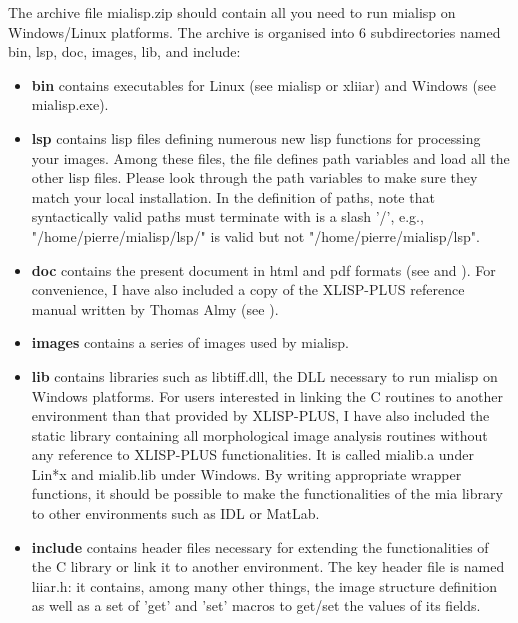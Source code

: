 \documentclass{book}
\begin{document}
The archive file mialisp.zip should contain all you need to run mialisp on Windows/Linux platforms.  The archive is organised into 6 subdirectories named bin, lsp, doc, images, lib, and include:
\begin{itemize}
\item {\bf bin} contains executables for Linux (see mialisp or xliiar) and Windows (see mialisp.exe).
\item {\bf lsp} contains lisp files defining numerous new lisp functions for processing your images.  Among these files, the file  defines path variables and load all the other lisp files.  Please look through the path variables to make sure they match your local installation.  In the definition of paths, note that syntactically valid paths must terminate with is a slash '/', e.g., "/home/pierre/mialisp/lsp/" is valid but not "/home/pierre/mialisp/lsp".
\item {\bf doc} contains the present document in html and pdf formats (see  and  ).  For convenience, I have also included a copy of the XLISP-PLUS reference manual written by Thomas Almy (see ).
\item {\bf images} contains a series of images used by mialisp.
\item {\bf lib} contains libraries such as libtiff.dll, the  DLL necessary to run mialisp on Windows platforms.  For users interested in linking the C routines to another environment than that provided by XLISP-PLUS, I have also included the static library containing all morphological image analysis routines without any reference to XLISP-PLUS functionalities.  It is called mialib.a under Lin*x and mialib.lib under Windows.  By writing appropriate wrapper functions, it should be possible to make the functionalities of the mia library to other environments such as IDL or MatLab.
\item {\bf include} contains header files necessary for extending the functionalities of the C library or link it to another environment.  The key header file is named liiar.h: it contains, among many other things, the image structure definition as well as a set of 'get' and 'set' macros to get/set the values of its fields.
\end{itemize}
\end{document}
